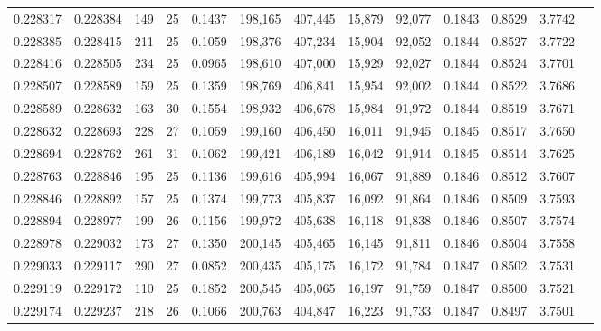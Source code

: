 \begin{tabular}{rrrrrrrrrrrrr}
0.228317 & 0.228384 &   149 &  25 &                                     0.1437 & 198,165 & 407,445 &  15,879 &  92,077 & 0.1843 & 0.8529 & 3.7742 \\
0.228385 & 0.228415 &   211 &  25 &                                     0.1059 & 198,376 & 407,234 &  15,904 &  92,052 & 0.1844 & 0.8527 & 3.7722 \\
0.228416 & 0.228505 &   234 &  25 &                                     0.0965 & 198,610 & 407,000 &  15,929 &  92,027 & 0.1844 & 0.8524 & 3.7701 \\
0.228507 & 0.228589 &   159 &  25 &                                     0.1359 & 198,769 & 406,841 &  15,954 &  92,002 & 0.1844 & 0.8522 & 3.7686 \\
0.228589 & 0.228632 &   163 &  30 &                                     0.1554 & 198,932 & 406,678 &  15,984 &  91,972 & 0.1844 & 0.8519 & 3.7671 \\
0.228632 & 0.228693 &   228 &  27 &                                     0.1059 & 199,160 & 406,450 &  16,011 &  91,945 & 0.1845 & 0.8517 & 3.7650 \\
0.228694 & 0.228762 &   261 &  31 &                                     0.1062 & 199,421 & 406,189 &  16,042 &  91,914 & 0.1845 & 0.8514 & 3.7625 \\
0.228763 & 0.228846 &   195 &  25 &                                     0.1136 & 199,616 & 405,994 &  16,067 &  91,889 & 0.1846 & 0.8512 & 3.7607 \\
0.228846 & 0.228892 &   157 &  25 &                                     0.1374 & 199,773 & 405,837 &  16,092 &  91,864 & 0.1846 & 0.8509 & 3.7593 \\
0.228894 & 0.228977 &   199 &  26 &                                     0.1156 & 199,972 & 405,638 &  16,118 &  91,838 & 0.1846 & 0.8507 & 3.7574 \\
0.228978 & 0.229032 &   173 &  27 &                                     0.1350 & 200,145 & 405,465 &  16,145 &  91,811 & 0.1846 & 0.8504 & 3.7558 \\
0.229033 & 0.229117 &   290 &  27 &                                     0.0852 & 200,435 & 405,175 &  16,172 &  91,784 & 0.1847 & 0.8502 & 3.7531 \\
0.229119 & 0.229172 &   110 &  25 &                                     0.1852 & 200,545 & 405,065 &  16,197 &  91,759 & 0.1847 & 0.8500 & 3.7521 \\
0.229174 & 0.229237 &   218 &  26 &                                     0.1066 & 200,763 & 404,847 &  16,223 &  91,733 & 0.1847 & 0.8497 & 3.7501 \\

\end{tabular}
